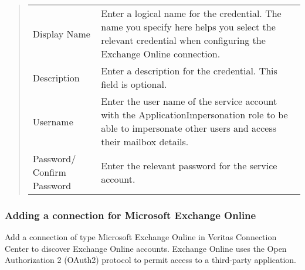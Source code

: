 \documentclass[letterpaper,10pt,english]{sphinxmanual}
\begin{document}
\begin{quote}


\begin{savenotes}\sphinxattablestart
\centering
\begin{tabulary}{\linewidth}[t]{|T|T|}
\hline
{}\relax &\relax \\
\hline
Display Name
&
Enter a logical name for the credential. The name you specify here
helps you select the relevant credential when configuring the Exchange
Online connection.
\\
\hline
Description
&
Enter a description for the credential. This field is optional.
\\
\hline
Username
&
Enter the user name of the service account with the
ApplicationImpersonation role to be able to impersonate other users and
access their mailbox details.
\\
\hline
Password/
Confirm Password
&
Enter the relevant password for the service account.
\\
\hline
\end{tabulary}
\par
\sphinxattableend\end{savenotes}
\end{quote}


\subsubsection{Adding a connection for Microsoft Exchange Online}
\label{\detokenize{mcdmp_app_ug:adding-a-connection-for-microsoft-exchange-online}}
Add a connection of type Microsoft Exchange Online in Veritas Connection Center to discover Exchange Online accounts. Exchange Online uses the Open Authorization 2 (OAuth2) protocol to permit access to a third-party application.
\end{document}

